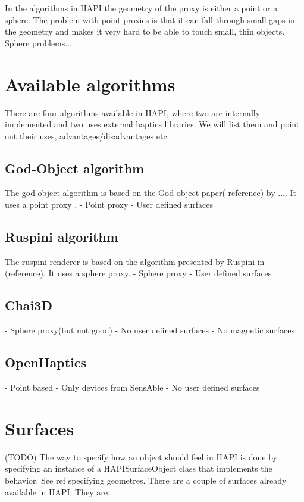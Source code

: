 In the algorithms in HAPI the geometry of the proxy is either a point
or a sphere. The problem with point proxies is that it can fall
through small gaps in the geometry and makes it very hard to be able
to touch small, thin objects. Sphere problems... 

\section{Available algorithms}
There are four algorithms available in HAPI, where two are internally
implemented and two uses external haptics libraries. We will list them
and point out their uses, advantages/disadvantages etc.

\subsection{God-Object algorithm}
The god-object algorithm is based on the God-object paper( reference)
by .... It uses a point proxy .
- Point proxy
- User defined surfaces

\subsection{Ruspini algorithm}
The ruspini renderer is based on the algorithm presented by Ruspini in
(reference). It uses a sphere proxy.
- Sphere proxy
- User defined surfaces


\subsection{Chai3D}
- Sphere proxy(but not good)
- No user defined surfaces
- No magnetic surfaces

\subsection{OpenHaptics}
- Point based
- Only devices from SensAble
- No user defined surfaces

\section{Surfaces}
(TODO)
The way to specify how an object should feel in HAPI is done by
specifying an instance of a HAPISurfaceObject class that implements
the behavior. See ref specifying geometres. There are a couple of
surfaces already available in HAPI. They are:

